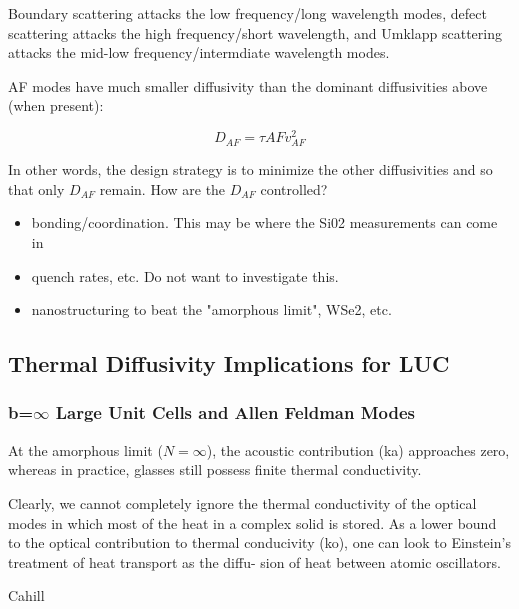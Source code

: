 \documentclass[letterpaper,12pt]{article}
\begin{document}
Boundary scattering attacks the low frequency/long wavelength modes, defect scattering attacks the high frequency/short wavelength, and Umklapp scattering attacks the mid-low frequency/intermdiate wavelength modes.

AF modes have much smaller diffusivity than the dominant diffusivities above (when present):

\begin{equation}\label{EQ:M:l_glass}
D_{AF} =  \tau{AF}v^2_{AF}
\end{equation}

In other words, the design strategy is to minimize the other diffusivities and so that only $D_{AF}$ remain.  How are the $D_{AF}$ controlled?

\begin{itemize}

\item bonding/coordination.  This may be where the Si02 measurements can come in

\item quench rates, etc.  Do not want to investigate this.

\item nanostructuring to beat the "amorphous limit", WSe2, etc.

\end{itemize}

\subsection{\label{S-validation-samples}Thermal Diffusivity Implications for LUC}

\subsubsection{\label{S-validation-samples}b=$\infty$ Large Unit Cells and Allen Feldman Modes}

At the amorphous limit ($N = \infty$), the acoustic contribution (ka) approaches
zero, whereas in practice, glasses still possess finite thermal conductivity.

Clearly, we cannot completely ignore the thermal conductivity of the optical modes in which most of the heat in a complex solid is stored. As a lower bound to the optical contribution to thermal conducivity (ko), one can look to Einstein’s treatment of heat transport as the diffu-
sion of heat between atomic oscillators.

Cahill 
\end{document}
